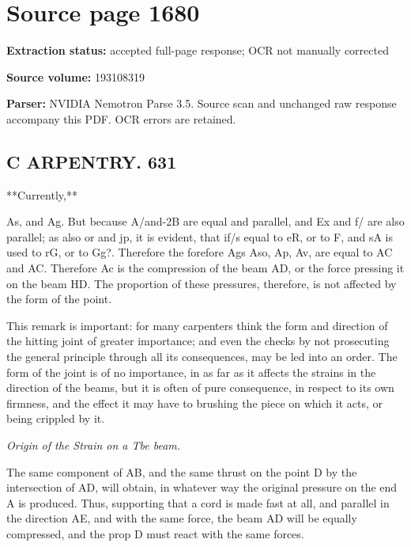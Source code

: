 \clearpage
\section{Source page 1680}
\textbf{Extraction status:} accepted full-page response; OCR not manually corrected\par
\textbf{Source volume:} 193108319\par
\textbf{Parser:} NVIDIA Nemotron Parse 3.5. Source scan and unchanged raw response accompany this PDF. OCR errors are retained.\par\medskip
\subsection*{C ARPENTRY. 631}
**Currently,**\par\medskip
As, and Ag. But because A/and-2B are equal and parallel, and Ex and f/ are also parallel; as also or and jp, it is evident, that if/s equal to eR, or to F, and sA is used to rG, or to Gg?. Therefore the forefore Ags Aso, Ap, Av, are equal to AC and AC. Therefore Ac is the compression of the beam AD, or the force pressing it on the beam HD. The proportion of these pressures, therefore, is not affected by the form of the point.\par\medskip
This remark is important: for many carpenters think the form and direction of the hitting joint of greater importance; and even the checks by not prosecuting the general principle through all its consequences, may be led into an order. The form of the joint is of no importance, in as far as it affects the strains in the direction of the beams, but it is often of pure consequence, in respect to its own firmness, and the effect it may have to brushing the piece on which it acts, or being crippled by it.\par\medskip
{\small\itshape Origin of the Strain on a Tbe beam.\par}\medskip
The same component of AB, and the same thrust on the point D by the intersection of AD, will obtain, in whatever way the original pressure on the end A is produced. Thus, supporting that a cord is made fast at all, and parallel in the direction AE, and with the same force, the beam AD will be equally compressed, and the prop D must react with the same forces.\par\medskip
